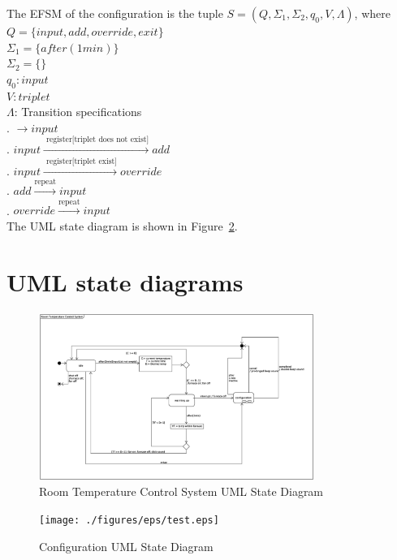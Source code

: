 \documentclass[12pt]{article}
\begin{document}
\begin{spacing}{1.5}
\noindent The EFSM of the configuration is the tuple $S = (Q, \Sigma_1, \Sigma_2, q_0, V, \Lambda)$, where\\
\noindent $Q = \{input, add, override, exit\}$\\
\noindent $\Sigma_1 = \{after(1 min)\}$\\
\noindent $\Sigma_2 = \{\}$\\
\noindent $q_0: input$\\
\noindent $V: triplet$\\
\noindent $\Lambda$: Transition specifications\\
. $\rightarrow input$\\
. $input \xrightarrow {\text { register[triplet does not exist]}} add$\\
. $input \xrightarrow {\text { register[triplet exist]}} override$\\
. $add \xrightarrow {\text {repeat}} input$\\
. $override \xrightarrow {\text {repeat}} input$\\

\noindent The UML state diagram is shown in Figure~\ref{fig:configuration-fig}.

\newpage

\section{UML state diagrams}

\begin{figure}[h!]
	\centering
		\includegraphics[width=0.8\textwidth]{./figures/eps/SystemEFSM.eps}
		  \caption{Room Temperature Control System UML State Diagram}
  \label{fig:system-fig}
\end{figure}

\begin{figure}[h!]
	\centering
		\texttt{[image: ./figures/eps/test.eps]}
		  \caption{Configuration UML State Diagram}
  \label{fig:configuration-fig}
\end{figure}

\end{spacing}
\end{document}
